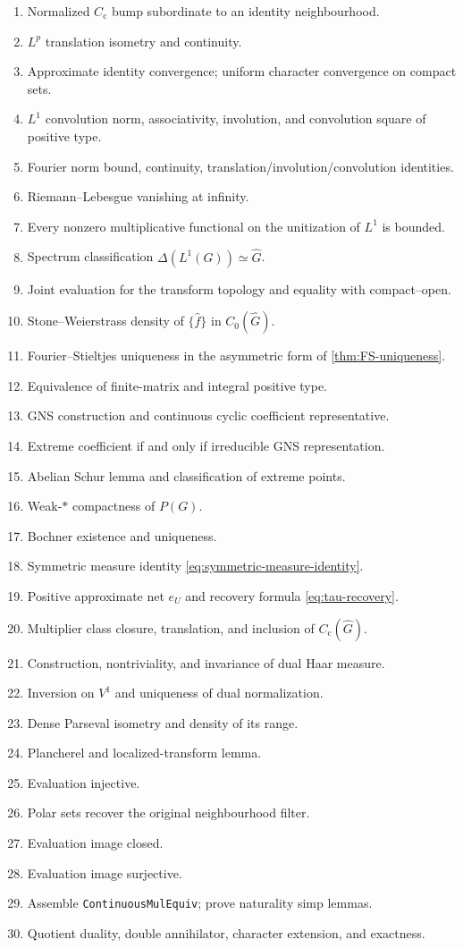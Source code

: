 \documentclass[11pt]{article}
\theoremstyle{definition}
\theoremstyle{remark}
\newcommand{\Cc}{C_{\mathrm c}}
\newcommand{\Czero}{C_0}
\newcommand{\Lp}[1]{L^{#1}}
\newcommand{\dual}[1]{\widehat{#1}}
\begin{document}
\begin{enumerate}[label=\textbf{P\arabic*.},leftmargin=4em]
\item Normalized $\Cc$ bump subordinate to an identity neighbourhood.
\item $\Lp p$ translation isometry and continuity.
\item Approximate identity convergence; uniform character convergence on compact sets.
\item $\Lp1$ convolution norm, associativity, involution, and convolution square of
positive type.
\item Fourier norm bound, continuity, translation/involution/convolution identities.
\item Riemann--Lebesgue vanishing at infinity.
\item Every nonzero multiplicative functional on the unitization of $\Lp1$ is bounded.
\item Spectrum classification $\Delta(\Lp1(G))\simeq\dual G$.
\item Joint evaluation for the transform topology and equality with compact--open.
\item Stone--Weierstrass density of $\{\widehat f\}$ in $\Czero(\dual G)$.
\item Fourier--Stieltjes uniqueness in the asymmetric form of
\cref{thm:FS-uniqueness}.
\item Equivalence of finite-matrix and integral positive type.
\item GNS construction and continuous cyclic coefficient representative.
\item Extreme coefficient if and only if irreducible GNS representation.
\item Abelian Schur lemma and classification of extreme points.
\item Weak-$*$ compactness of $P(G)$.
\item Bochner existence and uniqueness.
\item Symmetric measure identity \eqref{eq:symmetric-measure-identity}.
\item Positive approximate net $e_U$ and recovery formula
\eqref{eq:tau-recovery}.
\item Multiplier class closure, translation, and inclusion of $\Cc(\dual G)$.
\item Construction, nontriviality, and invariance of dual Haar measure.
\item Inversion on $V^1$ and uniqueness of dual normalization.
\item Dense Parseval isometry and density of its range.
\item Plancherel and localized-transform lemma.
\item Evaluation injective.
\item Polar sets recover the original neighbourhood filter.
\item Evaluation image closed.
\item Evaluation image surjective.
\item Assemble \texttt{ContinuousMulEquiv}; prove naturality simp lemmas.
\item Quotient duality, double annihilator, character extension, and exactness.
\end{enumerate}
\end{document}
